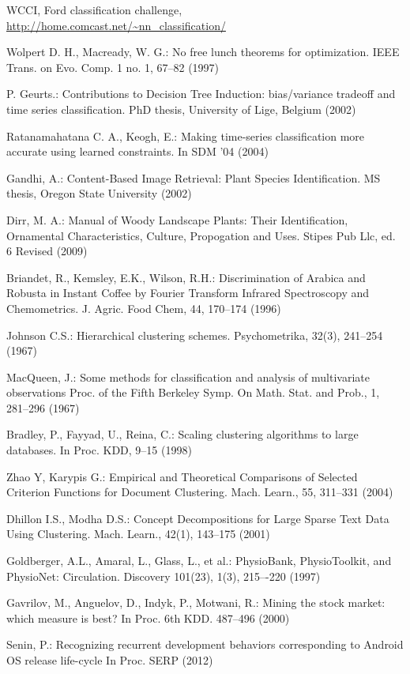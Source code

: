 \documentclass{llncs}
\begin{document}
\begin{thebibliography}{5}
WCCI, Ford classification challenge,
\url{http://home.comcast.net/~nn_classification/}

Wolpert D. H., Macready, W. G.:
No free lunch theorems for optimization.
IEEE Trans. on Evo. Comp. 1 no. 1, 67--82 (1997)

P. Geurts.:
Contributions to Decision Tree Induction: bias/variance tradeoff and time series classification.
PhD thesis, University of Lige, Belgium (2002)

Ratanamahatana C. A., Keogh, E.:
Making time-series classification more accurate using learned constraints. 
In SDM '04 (2004)

Gandhi, A.:
Content-Based Image Retrieval: Plant Species Identification. 
MS thesis, Oregon State University (2002)

Dirr, M. A.:
Manual of Woody Landscape Plants: Their Identification, Ornamental Characteristics,
Culture, Propogation and Uses.
Stipes Pub Llc, ed. 6 Revised (2009)

Briandet, R., Kemsley, E.K., Wilson, R.H.:
Discrimination of Arabica and Robusta in Instant Coffee by Fourier Transform Infrared Spectroscopy
and Chemometrics.
J. Agric. Food Chem, 44, 170--174 (1996)

Johnson C.S.:
Hierarchical clustering schemes.
Psychometrika, 32(3), 241--254 (1967)

MacQueen, J.:
Some methods for classification and analysis of multivariate observations
Proc. of the Fifth Berkeley Symp. On  Math. Stat. and Prob., 1, 281--296 (1967)

Bradley, P., Fayyad, U., Reina, C.:
Scaling clustering algorithms to large databases. 
In Proc. KDD, 9--15 (1998)

Zhao Y, Karypis G.:
Empirical and Theoretical Comparisons of Selected Criterion Functions for Document Clustering.
Mach. Learn., 55, 311--331 (2004)

Dhillon I.S., Modha D.S.:
Concept Decompositions for Large Sparse Text Data Using Clustering.
Mach. Learn., 42(1), 143--175 (2001)

Goldberger, A.L., Amaral, L., Glass, L., et al.: PhysioBank, PhysioToolkit, and 
PhysioNet: Circulation. Discovery 101(23), 1(3), 215–-220 (1997) 

Gavrilov, M., Anguelov, D., Indyk, P., Motwani, R.:
Mining the stock market: which measure is best? 
In Proc. 6th KDD. 487--496 (2000)

Senin, P.: 
Recognizing recurrent development behaviors corresponding to Android OS release life-cycle
In Proc. SERP (2012)



\end{thebibliography}
\end{document}
